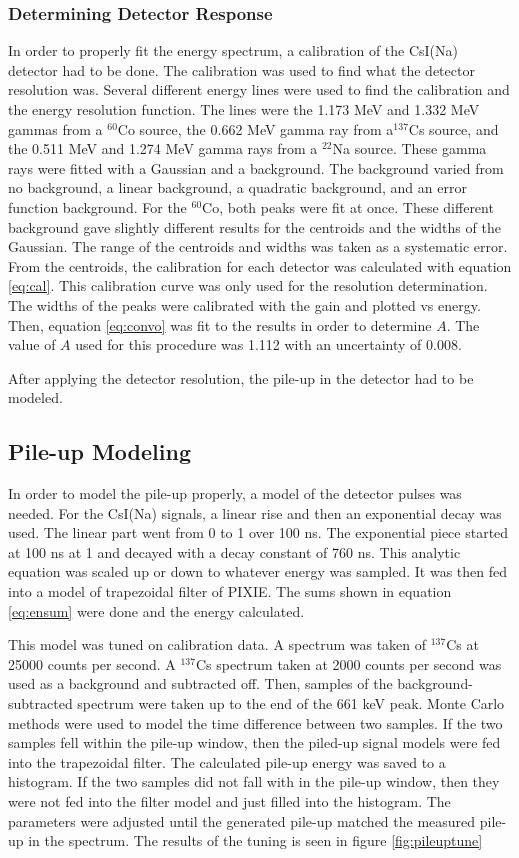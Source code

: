 \documentclass[../MaxHughesThesis.tex]{subfiles}
\begin{document}
\subsubsection{Determining Detector Response}
In order to properly fit the energy spectrum, a calibration of the CsI(Na) detector had to be done.
The calibration was used to find what the detector resolution was.
Several different energy lines were used to find the calibration and the energy resolution function.
The lines were the 1.173 MeV and 1.332 MeV gammas from a $^{60}$Co source, the 0.662 MeV gamma ray from a$^{137}$Cs source, and the 0.511 MeV and 1.274 MeV gamma rays from a $^{22}$Na source.
These gamma rays were fitted with a Gaussian and a background.
The background varied from no background, a linear background, a quadratic background, and an error function background.
For the $^{60}$Co, both peaks were fit at once.
These different background gave slightly different results for the centroids and the widths of the Gaussian.
The range of the centroids and widths was taken as a systematic error.
From the centroids, the calibration for each detector was calculated with equation \ref{eq:cal}. 
This calibration curve was only used for the resolution determination.
The widths of the peaks were calibrated with the gain and plotted vs energy.
Then, equation \ref{eq:convo} was fit to the results in order to determine $A$.
The value of $A$ used for this procedure was 1.112 with an uncertainty of 0.008.

After applying the detector resolution, the pile-up in the detector had to be modeled.

\subsection{Pile-up Modeling}
In order to model the pile-up properly, a model of the detector pulses was needed. 
For the CsI(Na) signals, a linear rise and then an exponential decay was used.
The linear part went from 0 to 1 over 100 ns. 
The exponential piece started at 100 ns at 1 and decayed with a decay constant of 760 ns.
This analytic equation was scaled up or down to whatever energy was sampled.
It was then fed into a model of trapezoidal filter of PIXIE. 
The sums shown in equation \ref{eq:ensum} were done and the energy calculated.

This model was tuned on calibration data. 
A spectrum was taken of $^{137}$Cs at 25000 counts per second.
A  $^{137}$Cs spectrum taken at 2000 counts per second was used as a background and subtracted off.
Then, samples of the background-subtracted spectrum were taken up to the end of the 661 keV peak.
Monte Carlo methods were used to model the time difference between two samples.
If the two samples fell within the pile-up window, then the piled-up signal models were fed into the trapezoidal filter.
The calculated pile-up energy was saved to a histogram.
If the two samples did not fall with in the pile-up window, then they were not fed into the filter model and just filled into the histogram.
The parameters were adjusted until the generated pile-up matched the measured pile-up in the spectrum.
The results of the tuning is seen in figure \ref{fig:pileuptune}
\end{document}
